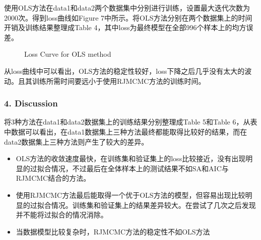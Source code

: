 \documentclass[twocolumn]{article}
\begin{document}
使用OLS方法在data1和data2两个数据集中分别进行训练，设置最大迭代次数为2000次。得到loss曲线如Figure 7中所示。将OLS方法分别在两个数据集上的时间开销及训练结果整理成Table 4，其中loss为最终模型在全部996个样本上的均方误差。

\begin{figure}[H]
  \centering
  \hspace{0in}
  \caption{Loss Curve for OLS method}
\end{figure}

从loss曲线中可以看出，OLS方法的稳定性较好，loss下降之后几乎没有太大的波动。且其训练所需时间要远小于使用RJMCMC方法的训练时间。

\subsubsection*{4. Discussion}

将3种方法在data1和data2数据集上的训练结果分别整理成Table 5和Table 6，从表中数据可以看出，在data1数据集上三种方法最终都能取得比较好的结果，而在data2数据集上三种方法则产生了较大的差异。

\begin{itemize}

\item OLS方法的收敛速度最快，在训练集和验证集上的loss比较接近，没有出现明显的过拟合情况，不过最后在全体样本上的测试结果不如SA和AIC与RJMCMC结合的方法。

\item 使用RJMCMC方法最后能取得一个优于OLS方法的模型，但容易出现比较明显的过拟合情况。训练集和验证集上的结果差异较大。在尝试了几次之后发现并不能将过拟合的情况消除。

\item 当数据模型比较复杂时，RJMCMC方法的稳定性不如OLS方法

\end{itemize}
\end{document}
